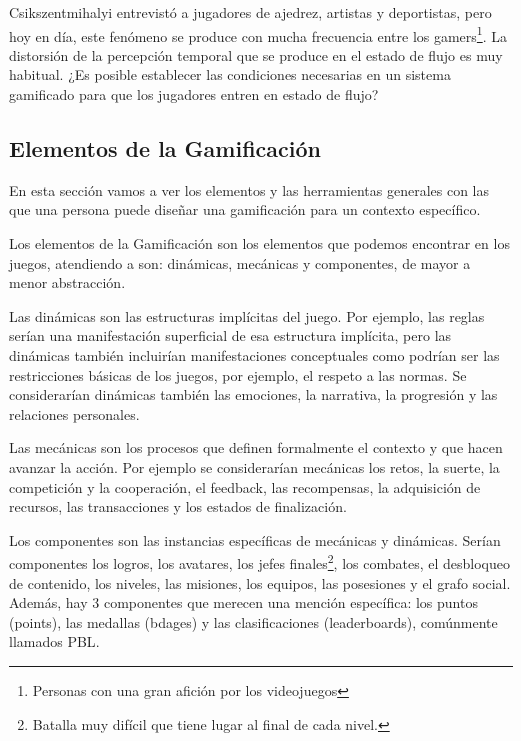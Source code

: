 Csikszentmihalyi entrevistó a jugadores de ajedrez, artistas y deportistas, pero hoy en día, este fenómeno se produce con mucha frecuencia entre los gamers\footnote{Personas con una gran afición por los videojuegos}.
%
La distorsión de la percepción temporal que se produce en el estado de flujo es muy habitual.
%
¿Es posible establecer las condiciones necesarias en un sistema gamificado para que los jugadores entren en estado de flujo?


\subsection{Elementos de la Gamificación}

En esta sección vamos a ver los elementos y las herramientas generales con las que una persona puede diseñar una gamificación para un contexto específico.

Los elementos de la Gamificación son los elementos que podemos encontrar en los juegos, atendiendo a  \cite{werbach2012win} son: dinámicas, mecánicas y componentes, de mayor a menor abstracción.

%
Las dinámicas son las estructuras implícitas del juego. 
%
Por ejemplo, las reglas serían una manifestación superficial de esa estructura implícita, pero las dinámicas también incluirían manifestaciones conceptuales como podrían ser las restricciones básicas de los juegos, por ejemplo, el respeto a las normas.
%
Se considerarían dinámicas también las emociones, la narrativa, la progresión y las relaciones personales. 

 Las mecánicas son los procesos que definen formalmente el contexto y que hacen avanzar la acción. 
%
Por ejemplo se considerarían mecánicas los retos, la suerte, la competición y la cooperación, el feedback, las recompensas, la adquisición de recursos, las transacciones y los estados de finalización.

 Los componentes son las instancias específicas de mecánicas y dinámicas. 
%
Serían componentes los logros, los avatares, los jefes finales\footnote{Batalla muy difícil que tiene lugar al final de cada nivel.}, los combates, el desbloqueo de contenido, los niveles, las misiones, los equipos, las posesiones y el grafo social.
%
Además, hay 3 componentes que merecen una mención específica: los puntos (points), las medallas (bdages) y las clasificaciones (leaderboards), comúnmente llamados \gls{PBL}.

